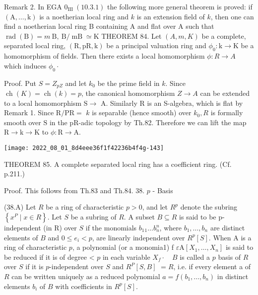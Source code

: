 Remark 2. In EGA $0_{\text {III }}(10.3 .1)$ the following more general theorem is proved: if $(\mathrm{A}, \ldots, \mathrm{k})$ is a noetherian local ring and $k$ is an extension field of $k$, then one can find a noetherian local ring B containing A and flat over A such that $\operatorname{rad}(\mathrm{B})=m \mathrm{~B}, \mathrm{~B} / \operatorname{mB} \simeq \mathrm{K}$ THEOREM 84. Let $(A, m, K)$ be a complete, separated local ring, $(\mathrm{R}, \mathrm{pR}, \mathrm{k})$ be a principal valuation ring and $\phi_{0}: \mathrm{k} \rightarrow \mathrm{K}$ be a homomorphism of fields. Then there exists a local homomorphism $\phi: R \rightarrow A$ which induces $\phi_{0} \cdot$

Proof. Put $S=Z_{p Z}$ and let $k_{0}$ be the prime field in $k$. Since $\operatorname{ch}(K)=\operatorname{ch}(k)=p$, the canonical homomorphism $Z \rightarrow A$ can be extended to a local homomorphism $\mathrm{S} \rightarrow$ A. Similarly $\mathrm{R}$ is an S-algebra, which is flat by Remark 1. Since $\mathrm{R} / \mathrm{PR}=$ $k$ is separable (hence smooth) over $k_{0}, R$ is formally smooth over $\mathrm{S}$ in the pR-adic topology by Th.82. Therefore we can lift the map $\mathrm{R} \rightarrow \mathrm{k} \rightarrow \mathrm{K}$ to $\phi: \mathrm{R} \rightarrow \mathrm{A}$.

\texttt{[image: 2022\_08\_01\_8d4eee36f1f42236b4f4g-143]}

THEOREM 85. A complete separated local ring has a coefficient ring. (Cf. p.211.)

Proof. This follows from Th.83 and Th.84. 38. $p$ - Basis

(38.A) Let $R$ be a ring of characteristic $p>0$, and let $R^{p}$ denote the subring $\left\{x^{P} \mid x \in R\right\}$. Let $S$ be a subring of $R$. A subset $B \subseteq R$ is said to be p-independent (in R) over $S$ if the monomials $b_{1}{ }_{1} \ldots b_{n}^{n}$, where $b_{1}, \ldots, b_{n}$ are distinct elements of $B$ and $0 \leqslant e_{i}<p$, are linearly independent over $R^{p}[S]$. When A is a ring of characteristic $p$, a polynomial (or a monomia1) f $\varepsilon \mathrm{A}\left[X_{1}, \ldots, X_{n}\right]$ is said to be reduced if it is of degree < $p$ in each variable $X_{f} \cdot \quad B$ is called a $p$ basis of $R$ over $S$ if it is $p$-independent over $S$ and $R^{P}[S, B]$ $=R$, i.e. if every element a of $R$ can be written uniquely as a reduced polynomial $a=f\left(b_{1}, \ldots, b_{n}\right)$ in distinct elements $b_{i}$ of $B$ with coefficients in $R^{p}[S]$.

